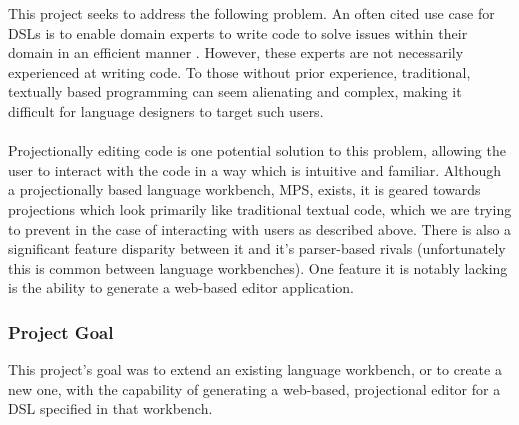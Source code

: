 \documentclass{report}
\begin{document}
This project seeks to address the following problem. An often cited use case for DSLs is to enable domain experts to write code to solve issues within their domain in an efficient manner . However, these experts are not necessarily experienced at writing code.   To those without prior experience, traditional, textually based programming can seem alienating and complex,  making it difficult for language designers to target such users.
\\
\\
Projectionally editing code is one potential solution to this problem, allowing the user to interact with the code in a way which is intuitive and familiar. Although a projectionally based language workbench, MPS\cite{mps}, exists, it is geared towards projections which look primarily like traditional textual code, which we are trying to prevent in the case of interacting with users as described above. There is also a significant feature disparity between it and it's parser-based rivals (unfortunately this is common between language workbenches). One feature it is notably lacking is the ability to generate a web-based editor application.

\subsubsection{Project Goal}
This project's goal was to extend an existing language workbench, or to create a new one, with the capability of generating a web-based, projectional editor for a DSL specified in that workbench. 
\end{document}

